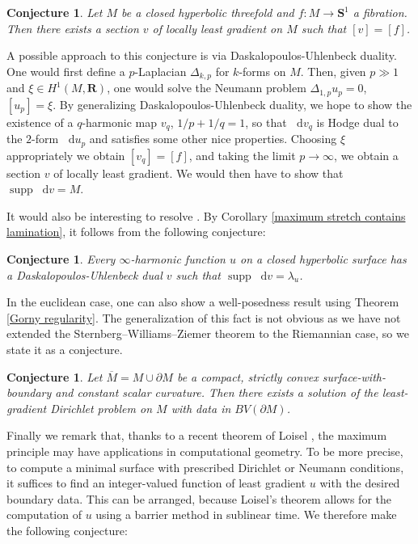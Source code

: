 \documentclass[reqno,10pt]{amsart}
\newcommand{\RR}{\mathbf{R}}
\newcommand{\Sph}{\mathbf S}
\DeclareMathOperator{\supp}{supp}
\newcommand*\dif{\mathop{}\!\mathrm{d}}
\newtheorem{conjecture}[theorem]{Conjecture}
\theoremstyle{definition}
\numberwithin{equation}{section}
\begin{document}
\begin{conjecture}
Let $M$ be a closed hyperbolic threefold and $f: M \to \Sph^1$ a fibration.
Then there exists a section $v$ of locally least gradient on $M$ such that $[v] = [f]$.
\end{conjecture}

A possible approach to this conjecture is via Daskalopoulos-Uhlenbeck duality.
One would first define a $p$-Laplacian $\Delta_{k,p}$ for $k$-forms on $M$.
Then, given $p \gg 1$ and $\xi \in H^1(M, \RR)$, one would solve the Neumann problem $\Delta_{1, p} u_p = 0$, $[u_p] = \xi$.
By generalizing Daskalopoulos-Uhlenbeck duality, we hope to show the existence of a $q$-harmonic map $v_q$, $1/p + 1/q = 1$, so that $\dif v_q$ is Hodge dual to the $2$-form $\dif u_p$ and satisfies some other nice properties.
Choosing $\xi$ appropriately we obtain $[v_q] = [f]$, and taking the limit $p \to \infty$, we obtain a section $v$ of locally least gradient.
We would then have to show that $\supp \dif v = M$.

It would also be interesting to resolve \cite[Problem 9.5]{daskalopoulos2020transverse}.
By Corollary \ref{maximum stretch contains lamination}, it follows from the following conjecture:

\begin{conjecture}\label{two laminations agree}
Every $\infty$-harmonic function $u$ on a closed hyperbolic surface has a Daskalopoulos-Uhlenbeck dual $v$ such that $\supp \dif v = \lambda_u$.
\end{conjecture}

In the euclidean case, one can also show a well-posedness result \cite[Theorem 1.1]{górny2017planar} using Theorem \ref{Gorny regularity}.
The generalization of this fact is not obvious as we have not extended the Sternberg--Williams--Ziemer theorem \cite{ZiemerWilliamsSternberg1992} to the Riemannian case, so we state it as a conjecture.

\begin{conjecture}
Let $\overline M = M \cup \partial M$ be a compact, strictly convex surface-with-boundary and constant scalar curvature.
Then there exists a solution of the least-gradient Dirichlet problem on $M$ with data in $BV(\partial M)$.
\end{conjecture}

Finally we remark that, thanks to a recent theorem of Loisel \cite{Loisel20}, the maximum principle may have applications in computational geometry.
To be more precise, to compute a minimal surface with prescribed Dirichlet or Neumann conditions, it suffices to find an integer-valued function of least gradient $u$ with the desired boundary data.
This can be arranged, because Loisel's theorem allows for the computation of $u$ using a barrier method in sublinear time. We therefore make the following conjecture:
\end{document}
